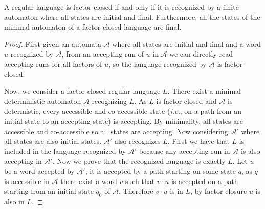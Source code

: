 \begin{lemma}
	A regular language is factor-closed if and only if it is recognized by a finite automaton where all states are initial and final. Furthermore, all the states of the minimal automaton of a factor-closed language are final.
\end{lemma}
\begin{proof}
	First given an automata $\mathcal{A}$ where all states are initial and final and a word $u$ recognized by $\mathcal{A}$, from an accepting run of $u$ in $\mathcal{A}$ we can directly read accepting runs for all factors of $u$, so the language recognized by $\mathcal{A}$ is factor-closed.
	
	Now, we consider a factor closed regular language $L$.
	There exist a minimal deterministic automaton $\mathcal{A}$ recognizing $L$.
	As $L$ is factor closed and $\mathcal{A}$ is determistic, every accessible and co-accessible state (\emph{i.e.}, on a path from an initial state to an accepting state) is accepting.
	By minimality, all states are accessible and co-accessible so all states are accepting.
	Now considering $\mathcal{A}'$ where all states are also initial states.
	$\mathcal{A}'$ also recognizes $L$. First we have that $L$ is included in the language recognized by $\mathcal{A}'$ because any accepting run in $\mathcal{A}$ is also accepting in $\mathcal{A}'$.
	Now we prove that the recognized language is exactly $L$. 
	Let $u$ be a word accepted by $\mathcal{A}'$, it is accepted by a path starting on some state $q$, as $q$ is accessible in $\mathcal{A}$ there exist a word $v$ such that $v\cdot u$ is accepted on a path starting from an initial state $q_0$ of $\mathcal{A}$. Therefore $v\cdot u$ is in $L$, by factor closure $u$ is also in $L$.
\end{proof}



